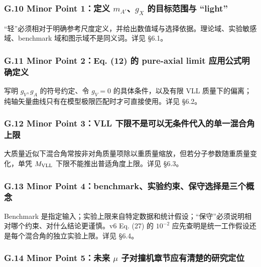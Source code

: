 \documentclass[
  chinese,
  UTF8]{ctexart}
\begin{document}
\subsubsection{\texorpdfstring{G.10 Minor Point 1：定义
\(m_{A'}\)、\(g_X\) 的目标范围与
``light''}{G.10 Minor Point 1：定义 m\_\{A\textquotesingle\}、g\_X 的目标范围与 ``light''}}\label{g.10-minor-point-1ux5b9aux4e49-m_ag_x-ux7684ux76eeux6807ux8303ux56f4ux4e0e-light}

``轻''必须相对于明确参考尺度定义，并给出数值域与选择依据。理论域、实验敏感域、benchmark
域和图示域不是同义词。详见 §6.1。

\subsubsection{G.11 Minor Point 2：Eq. (12) 的 pure-axial limit
应用公式明确定义}\label{g.11-minor-point-2eq.-12-ux7684-pure-axial-limit-ux5e94ux7528ux516cux5f0fux660eux786eux5b9aux4e49}

写明 \(g_V,g_A\) 的符号约定、令 \(g_V=0\) 的具体条件，以及有限 VLL
质量下的偏离；纯轴矢量曲线只有在模型极限匹配时才可直接使用。详见 §6.2。

\subsubsection{G.12 Minor Point 3：VLL
下限不是可以无条件代入的单一混合角上限}\label{g.12-minor-point-3vll-ux4e0bux9650ux4e0dux662fux53efux4ee5ux65e0ux6761ux4ef6ux4ee3ux5165ux7684ux5355ux4e00ux6df7ux5408ux89d2ux4e0aux9650}

大质量近似下混合角常按非对角质量项除以重质量缩放，但若分子参数随重质量变化，单凭
\(M_{\rm VLL}\) 下限不能推出普适角度上限。详见 §6.3。

\subsubsection{G.13 Minor Point
4：benchmark、实验约束、保守选择是三个概念}\label{g.13-minor-point-4benchmarkux5b9eux9a8cux7ea6ux675fux4fddux5b88ux9009ux62e9ux662fux4e09ux4e2aux6982ux5ff5}

Benchmark
是指定输入；实验上限来自特定数据和统计假设；``保守''必须说明相对哪个约束、对什么结论更谨慎。v6
Eq. (27) 的 \(10^{-2}\)
应先查明是统一工作假设还是每个混合角的独立实验上限。详见 §6.4。

\subsubsection{\texorpdfstring{G.14 Minor Point 5：未来 \ensuremath{\mu}
子对撞机章节应有清楚的研究定位}{G.14 Minor Point 5：未来  子对撞机章节应有清楚的研究定位}}\label{g.14-minor-point-5ux672aux6765-ux5b50ux5bf9ux649eux673aux7ae0ux8282ux5e94ux6709ux6e05ux695aux7684ux7814ux7a76ux5b9aux4f4d}
\end{document}
